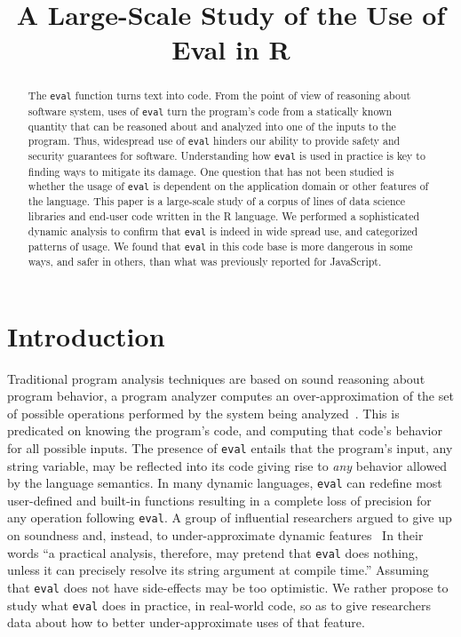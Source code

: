 \documentclass[a4paper,USenglish,cleveref, autoref, thm-restate]{lipics-v2019}
\title{A Large-Scale Study of the Use of Eval in R}
\newcommand{\eval}{\texttt{eval}\xspace}
\begin{document}
\maketitle

\begin{abstract}
  The \eval function turns text into code. From the point of view of
  reasoning about software system, uses of \eval turn the program's code
  from a statically known quantity that can be reasoned about and analyzed
  into one of the inputs to the program. Thus, widespread use of \eval
  hinders our ability to provide safety and security guarantees for
  software. Understanding how \eval is used in practice is key to finding
  ways to mitigate its damage. One question that has not been studied is
  whether the usage of \eval is dependent on the application domain or other
  features of the language. This paper is a large-scale study of a corpus of
  \CorpusAllCodeRnd lines of data science libraries and end-user code written in
  the R language. We performed a sophisticated dynamic analysis to confirm
  that \eval is indeed in wide spread use, and categorized patterns of
  usage. We found that \eval in this code base is more dangerous in some
  ways, and safer in others, than what was previously reported for
  JavaScript.
\end{abstract}

\section{Introduction}

Traditional program analysis techniques are based on sound reasoning about
program behavior, a program analyzer computes an over-approximation of the
set of possible operations performed by the system being
analyzed~\cite{cc77}.  This is predicated on knowing the program's code, and
computing that code's behavior for all possible inputs. The presence of
\eval entails that the program's input, any string variable, may be
reflected into its code giving rise to \emph{any} behavior allowed by the
language semantics. In many dynamic languages, \eval can redefine most
user-defined and built-in functions resulting in a complete loss of
precision for any operation following \eval. A group of influential
researchers argued to give up on soundness and, instead, to
under-approximate dynamic features~\cite{soundy} In their words ``a
practical analysis, therefore, may pretend that \eval does nothing, unless
it can precisely resolve its string argument at compile time.''  Assuming
that \eval does not have side-effects may be too optimistic. We rather
propose to study what \eval does in practice, in real-world code, so as to
give researchers data about how to better under-approximate uses of that
feature.
\end{document}
